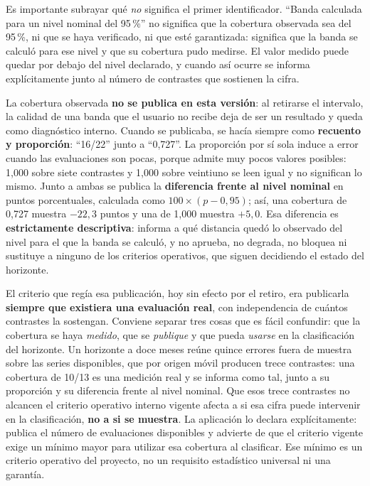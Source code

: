 \documentclass[12pt,letterpaper]{article}
\begin{document}
Es importante subrayar qué \emph{no} significa el primer identificador. ``Banda calculada para un nivel nominal del 95\,\%'' no significa que la cobertura observada sea del 95\,\%, ni que se haya verificado, ni que esté garantizada: significa que la banda se calculó para ese nivel y que su cobertura pudo medirse. El valor medido puede quedar por debajo del nivel declarado, y cuando así ocurre se informa explícitamente junto al número de contrastes que sostienen la cifra.

La cobertura observada \textbf{no se publica en esta versión}: al retirarse el intervalo, la calidad de una banda que el usuario no recibe deja de ser un resultado y queda como diagnóstico interno. Cuando se publicaba, se hacía siempre como \textbf{recuento y proporción}: ``16/22'' junto a ``0,727''. La proporción por sí sola induce a error cuando las evaluaciones son pocas, porque admite muy pocos valores posibles: 1,000 sobre siete contrastes y 1,000 sobre veintiuno se leen igual y no significan lo mismo. Junto a ambas se publica la \textbf{diferencia frente al nivel nominal} en puntos porcentuales, calculada como \(100\times(p-0{,}95)\); así, una cobertura de 0,727 muestra \(-22{,}3\) puntos y una de 1,000 muestra \(+5{,}0\). Esa diferencia es \textbf{estrictamente descriptiva}: informa a qué distancia quedó lo observado del nivel para el que la banda se calculó, y no aprueba, no degrada, no bloquea ni sustituye a ninguno de los criterios operativos, que siguen decidiendo el estado del horizonte.

El criterio que regía esa publicación, hoy sin efecto por el retiro, era publicarla \textbf{siempre que existiera una evaluación real}, con independencia de cuántos contrastes la sostengan. Conviene separar tres cosas que es fácil confundir: que la cobertura se haya \emph{medido}, que se \emph{publique} y que pueda \emph{usarse} en la clasificación del horizonte. Un horizonte a doce meses reúne quince errores fuera de muestra sobre las series disponibles, que por origen móvil producen trece contrastes: una cobertura de 10/13 es una medición real y se informa como tal, junto a su proporción y su diferencia frente al nivel nominal. Que esos trece contrastes no alcancen el criterio operativo interno vigente afecta a si esa cifra puede intervenir en la clasificación, \textbf{no a si se muestra}. La aplicación lo declara explícitamente: publica el número de evaluaciones disponibles y advierte de que el criterio vigente exige un mínimo mayor para utilizar esa cobertura al clasificar. Ese mínimo es un criterio operativo del proyecto, no un requisito estadístico universal ni una garantía.
\end{document}
